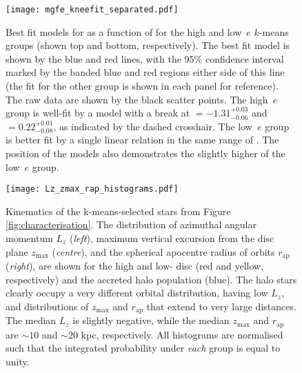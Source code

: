 \begin{figure}
\texttt{[image: mgfe\_kneefit\_separated.pdf]}
\caption[Best fit models for the \mgfe{} as a function of \feh{} for the low and high $e$ groups, showing the change of slope in \mgfe{}-\feh{} for the high $e$ population]{\label{fig:mgknee} Best fit models for \mgfe{} as a
function of \feh{} for the high and low~$e$ $k$-means groups (shown
top and bottom, respectively). The best fit model is shown by the
blue and red lines, with the 95$\%$ confidence interval marked by
the banded blue and red regions either side of this line (the fit
for the other group is shown in each panel for reference). The raw
data are shown by the black scatter points. The high~$e$ group is
well-fit by a model with a break at \feh{}$=-1.31^{+0.03}_{-0.06}$
and \mgfe{}$=0.22^{+0.01}_{-0.08}$, as indicated by the dashed
crosshair. The low~$e$ group is better fit by a single linear
relation in the same range of \feh{}. The position of the models
also demonstrates the slightly higher \mgfe{} of the low~$e$ group.}
\end{figure}


\begin{figure*}
\texttt{[image: Lz\_zmax\_rap\_histograms.pdf]} 
\caption[Angular momentum, $z_\mathrm{max}$ and $r_\mathrm{ap}$ distributions of the $k$-means groups]{\label{fig:kinematics} Kinematics of the k-means-selected
stars from Figure \ref{fig:characterisation}. The distribution
of azimuthal angular momentum $L_z$ (\emph{left}), maximum vertical
excursion from the disc plane $z_\mathrm{max}$ (\emph{centre}), and
the spherical apocentre radius of orbits $r_\mathrm{ap}$ (\emph{right}),
are shown for the high and low-\afe{} disc (red and yellow, respectively)
and the accreted halo population (blue). The halo stars clearly
occupy a very different orbital distribution, having low $L_z$, and
distributions of $z_\mathrm{max}$ and $r_\mathrm{ap}$ that extend
to very large distances. The median $L_z$ is slightly negative,
while the median $z_\mathrm{max}$ and $r_\mathrm{ap}$ are $\sim10$
and $\sim 20$ kpc, respectively. All histograms are normalised such
that the integrated probability under \emph{each} group is equal to
unity.}
\end{figure*}


